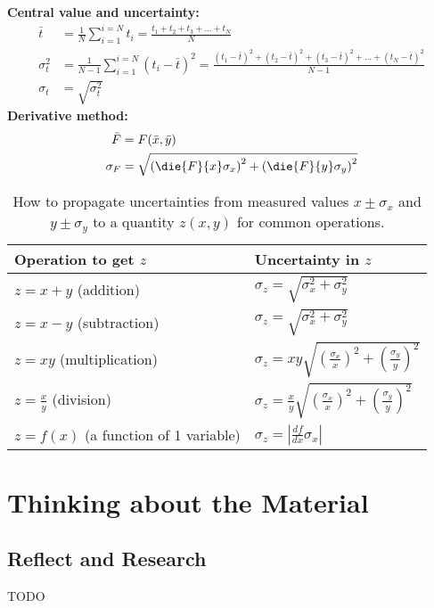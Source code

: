 \begin{importantEquations}
\textbf{Central value and uncertainty:}\\
\begin{align*}
\bar t &= \frac{1}{N}\sum_{i=1}^{i=N} t_i=\frac{t_1 +t_2 +t_3 +\dots+ t_N}{N} \\
\sigma_t^2 &=\frac{1}{N-1}\sum_{i=1}^{i=N}(t_i-\bar t)^2 = \frac{(t_1-\bar t)^2+(t_2-\bar t)^2+(t_3-\bar t)^2+\dots+(t_N-\bar t)^2}{N-1} \\
\sigma_t &=\sqrt{\sigma_t^2}
\end{align*}
\textbf{Derivative method:}\\
\begin{align*}
\bar F &= F(\bar x, \bar y) \nonumber \\
\sigma_F &= \sqrt{\left(\die{F}{x}\sigma_x \right)^2 + \left(\die{F}{y}\sigma_y \right)^2 }
\end{align*}
\begin{table}[H]
\centering
\begin{tabular}{p{2.5in}p{2in}} 
\textbf{Operation to get $z$} &\textbf{Uncertainty in $z$} \\
\hline
\hline
$z=x+y$ (addition) &  $\sigma_z=\sqrt{\sigma_x^2+\sigma_y^2}$ \\ \hline
$z=x-y$ (subtraction) & $\sigma_z=\sqrt{\sigma_x^2+\sigma_y^2}$ \\ \hline
$z=xy$ (multiplication) & $\sigma_z=xy\sqrt{\left(\frac{\sigma_x}{x}\right)^2+\left(\frac{\sigma_y}{y}\right)^2}$ \\ \hline
$z=\frac{x}{y}$ (division) & $\sigma_z=\frac{x}{y}\sqrt{\left(\frac{\sigma_x}{x}\right)^2+\left(\frac{\sigma_y}{y}\right)^2}$ \\ \hline
$z=f(x)$ (a function of 1 variable) &$\sigma_z=\left|\frac{df}{dx}\sigma_x \right|$ \\ \hline
\end{tabular}
\caption{\label{tab:ModelAndExperiment:prop_uncertainties} How to propagate uncertainties from measured values $x\pm\sigma_x$ and $y\pm\sigma_y$ to a quantity $z(x,y)$ for common operations.}
\end{table}
\end{importantEquations}

\section{Thinking about the Material}

\subsection{Reflect and Research}
TODO
\begin{reflectresearch}
\item
\end{reflectresearch}
